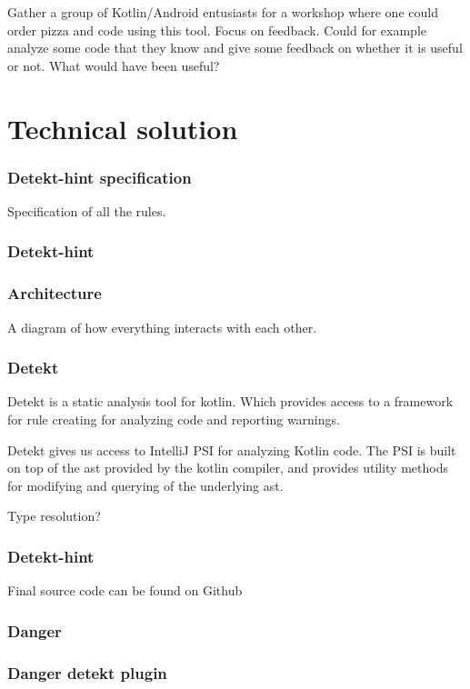 \documentclass{report}
\begin{document}
Gather a group of Kotlin/Android entusiasts for a workshop where one could order pizza and code using this tool. Focus on feedback. Could for example analyze some code that they know and give some feedback on whether it is useful or not. What would have been useful?


\section{Technical solution}
\label{technical-solution}
\subsubsection{Detekt-hint specification}
Specification of all the rules.

\subsubsection{Detekt-hint}

\subsubsection{Architecture}
A diagram of how everything interacts with each other.

\subsubsection{Detekt}
Detekt is a static analysis tool for kotlin. Which provides access to a framework for rule creating for analyzing code and reporting warnings.

Detekt gives us access to IntelliJ PSI for analyzing Kotlin code. The PSI is built on top of the \gls{ast} provided by the kotlin compiler, and provides utility methods for modifying and querying of the underlying \gls{ast}.

Type resolution?

\subsubsection{Detekt-hint}
Final source code can be found on Github\cite{detekt-hint-repository}

\subsubsection{Danger}

\subsubsection{Danger detekt plugin}
\end{document}
